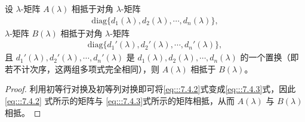 \documentclass[../../main.tex]{subfiles}%
\begin{document}
\begin{lemma}\label{lemma:对角元素的置换不改变相抵性}
设 $\lambda$-矩阵 $A(\lambda)$ 相抵于对角 $\lambda$-矩阵
\begin{align}
\mathrm{diag}\{d_1(\lambda),d_2(\lambda),\cdots,d_n(\lambda)\},
\label{eq:::7.4.2}
\end{align}
$\lambda$-矩阵 $B(\lambda)$ 相抵于对角 $\lambda$-矩阵
\begin{align}
\mathrm{diag}\{d_1'(\lambda),d_2'(\lambda),\cdots,d_n'(\lambda)\},
\label{eq:::7.4.3}
\end{align}
且 $d_1'(\lambda),d_2'(\lambda),\cdots,d_n'(\lambda)$ 是 $d_1(\lambda),d_2(\lambda),\cdots,d_n(\lambda)$ 的一个置换（即若不计次序，这两组多项式完全相同），则 $A(\lambda)$ 相抵于 $B(\lambda)$。
\end{lemma}
\begin{proof}

利用初等行对换及初等列对换即可将\eqref{eq:::7.4.2}式变成\eqref{eq:::7.4.3}式，因此\eqref{eq:::7.4.2} 式所示的矩阵与 \eqref{eq:::7.4.3}式所示的矩阵相抵，从而 $A(\lambda)$ 与 $B(\lambda)$ 相抵。

\end{proof}
\end{document}
